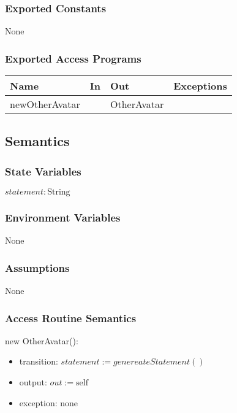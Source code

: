\documentclass[12pt, titlepage]{article}
\begin{document}
\subsubsection{Exported Constants}
None

\subsubsection{Exported Access Programs}

\begin{center}
\begin{tabular}{p{3cm} p{4cm} p{4cm} p{2cm}}
\hline
\textbf{Name} & \textbf{In} & \textbf{Out} & \textbf{Exceptions} \\
\hline
newOtherAvatar &  & OtherAvatar & \\
\hline

\end{tabular}
\end{center}

\subsection{Semantics}

\subsubsection{State Variables}
$\mathit{statement}: \text{String}$\\
\subsubsection{Environment Variables}
None

\subsubsection{Assumptions}
None

\subsubsection{Access Routine Semantics}

\noindent new OtherAvatar():
\begin{itemize}
\item transition: $\mathit{statement}:= genereateStatement()$
\item output: $out := \mbox{self}$
\item exception: none
\end{itemize}
\end{document}
